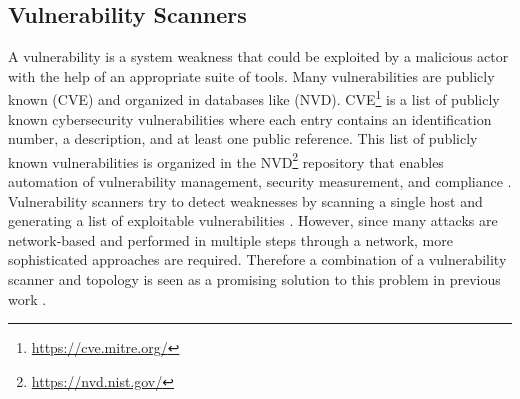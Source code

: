 \subsection{Vulnerability Scanners}
\label{chap:vulnerability_scanners}

 A vulnerability is a system weakness that could be exploited by a malicious actor with the help of an appropriate suite of tools. Many vulnerabilities are publicly known (CVE) and organized in databases like (NVD). CVE\footnote{\url{https://cve.mitre.org/}} is a list of publicly known cybersecurity vulnerabilities where each entry contains an identification number, a description, and at least one public reference. This list of publicly known vulnerabilities is organized in the  NVD\footnote{\url{https://nvd.nist.gov/}} repository that enables automation of vulnerability management, security measurement, and compliance \cite{booth2013national}. Vulnerability scanners try to detect weaknesses by scanning a single host and generating a list of exploitable vulnerabilities \cite{deraison1999nessus, farmer1990cops}. However, since many attacks are network-based and performed in multiple steps through a network, more sophisticated approaches are required. Therefore a combination of a vulnerability scanner and topology is seen as a promising solution to this problem in previous work \cite{sheyner2002automated, ingols2006practical}.

